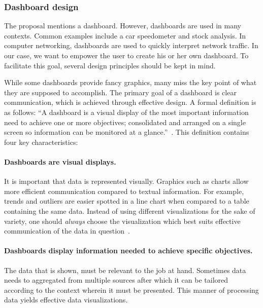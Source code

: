         \subsubsection{Dashboard design}\label{dashboards}

        The proposal mentions a dashboard. However, dashboards are used in many contexts. Common examples include a car speedometer and stock analysis. In computer networking, dashboards are used to quickly interpret network traffic. In our case, we want to empower the user to create his or her own dashboard. To facilitate this goal, several design principles should be kept in mind.
        
        While some dashboards provide fancy graphics, many miss the key point of what they are supposed to accomplish. The primary goal of a dashboard is clear communication, which is achieved through effective design. A formal definition is as follows: ``A dashboard is a visual display of the most important information need to achieve one or more objectives; consolidated and arranged on a single screen so information can be monitored at a glance.''~\cite{Few2006}. This definition contains four key characteristics:

        \paragraph{Dashboards are visual displays.} It is important that data is represented visually. Graphics such as charts allow more efficient communication compared to textual information. For example, trends and outliers are easier spotted in a line chart when compared to a table containing the same data. Instead of using different visualizations for the sake of variety, one should \emph{always} choose the visualization which best suits effective communication of the data in question~\cite{Few2005}.

        \paragraph{Dashboards display information needed to achieve specific objectives.} The data that is shown, must be relevant to the job at hand. Sometimes data needs to aggregated from multiple sources after which it can be tailored according to the context wherein it must be presented. This manner of processing data yields effective data visualizations.

